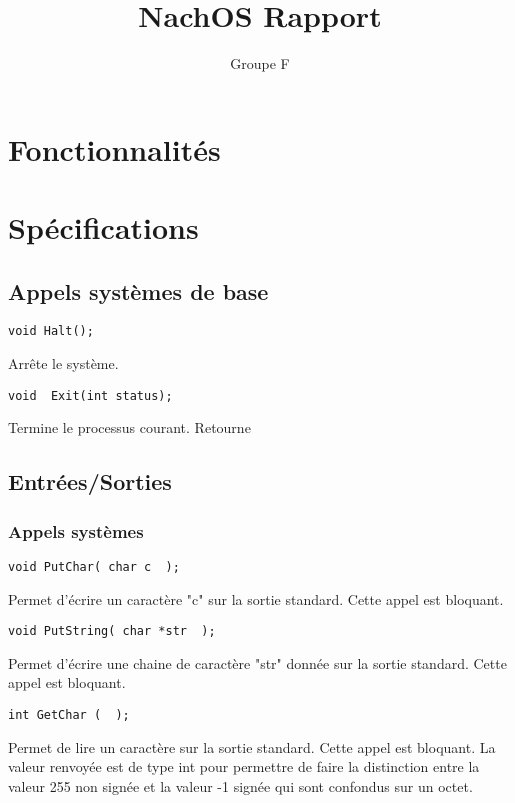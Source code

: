 \documentclass{report}
\title{NachOS Rapport}
\author{Groupe F}
\begin{document}
\maketitle

\tableofcontents

\chapter{Fonctionnalités}

\chapter{Spécifications}

\section{Appels systèmes de base}

\begin{verbatim}
void Halt();
\end{verbatim}
Arrête le système.

\begin{verbatim}
void  Exit(int status);
\end{verbatim}
Termine le processus courant. Retourne 
\section{Entrées/Sorties}

\subsection{Appels systèmes}

\begin{verbatim}
void PutChar( char c  );
\end{verbatim}
Permet d'écrire un caractère "c" sur la sortie standard. Cette appel est bloquant.

\begin{verbatim}
void PutString( char *str  );
\end{verbatim}
Permet d'écrire une chaine de caractère "str" donnée  sur la sortie standard. Cette appel est bloquant.

\begin{verbatim}
int GetChar (  );
\end{verbatim}
Permet de lire un caractère sur la sortie standard. Cette appel est bloquant. La valeur renvoyée est de type int pour permettre de faire la distinction entre  la valeur 255 non signée et la valeur -1 signée qui sont confondus sur un octet.
\end{document}
